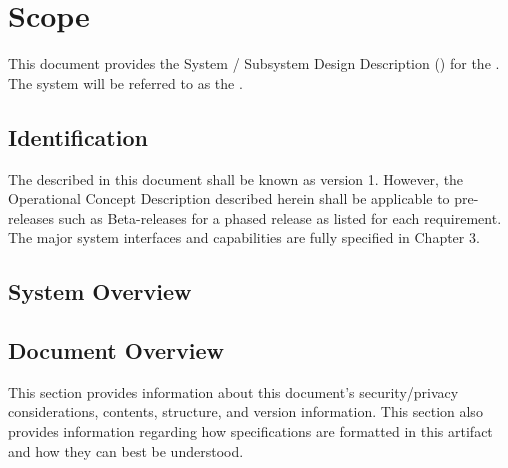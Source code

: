 
\chapter{Scope}
\label{loc:Scope}


This document provides the System / Subsystem Design Description (\SSDD) for the \ThisSystem. 
The system will be referred to as the \ThisSys.

\section{Identification}
\label{loc:Identification}


The \ThisSystem described in this document shall be known as \ThisSys version 1.
However, the Operational Concept Description {\OCD} described herein shall be applicable to pre-releases such as Beta-releases for a phased release as listed for each requirement.
The major system interfaces and capabilities are fully specified in Chapter 3.


\section{System Overview}
\label{loc:SystemOverview}




\newpage
\section{Document Overview}
\label{loc:DocumentOverview}


This section provides information about this document's security/privacy considerations, contents, structure, and version information.
This section also provides information regarding how specifications are formatted in this artifact and how they can best be understood.

% 

% 

% 

